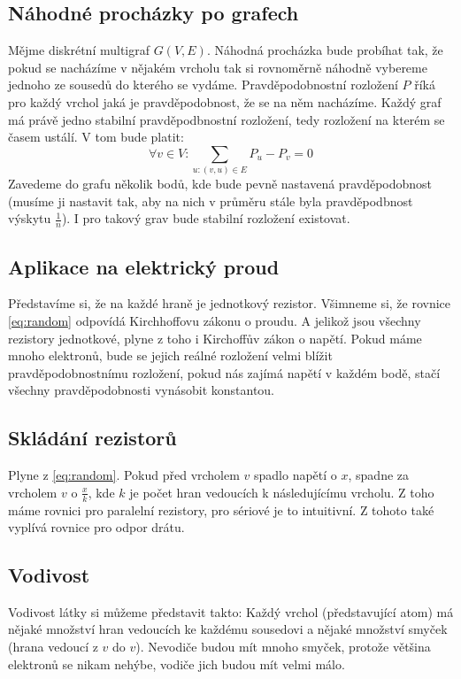 \documentclass[titlepage]{report}
\begin{document}
\subsection{Náhodné procházky po grafech}
Mějme diskrétní multigraf $G(V,E)$. Náhodná procházka bude probíhat tak, že pokud se nacházíme v nějakém vrcholu tak si rovnoměrně náhodně vybereme jednoho ze sousedů do kterého se vydáme. Pravděpodobnostní rozložení $P$ říká pro každý vrchol jaká je pravděpodobnost, že se na něm nacházíme. Každý graf má právě jedno stabilní pravděpodbnostní rozložení, tedy rozložení na kterém se časem ustálí. V tom bude platit:\\
\begin{equation}\label{eq:random}
\forall v \in V: \sum_{u: (v,u) \in E} P_u - P_v = 0
\end{equation}
Zavedeme do grafu několik bodů, kde bude pevně nastavená pravděpodobnost (musíme ji nastavit tak, aby na nich v průměru stále byla pravděpodbnost výskytu $\frac{1}{n}$). I pro takový grav bude stabilní rozložení existovat.
\subsection{Aplikace na elektrický proud}
Představíme si, že na každé hraně je jednotkový rezistor. Všimneme si, že rovnice \ref{eq:random} odpovídá Kirchhoffovu zákonu o proudu. A jelikož jsou všechny rezistory jednotkové, plyne z toho i Kirchoffův zákon o napětí. Pokud máme mnoho elektronů, bude se jejich reálné rozložení velmi blížit pravděpodobnostnímu rozložení, pokud nás zajímá napětí v každém bodě, stačí všechny pravděpodobnosti vynásobit konstantou.
\subsection{Skládání rezistorů}
Plyne z \ref{eq:random}. Pokud před vrcholem $v$ spadlo napětí o $x$, spadne za vrcholem $v$ o $\frac{x}{k}$, kde $k$ je počet hran vedoucích k následujícímu vrcholu. Z toho máme rovnici pro paralelní rezistory, pro sériové je to intuitivní. Z tohoto také vyplívá rovnice pro odpor drátu.
\subsection{Vodivost}
Vodivost látky si můžeme představit takto: Každý vrchol (představující atom) má nějaké množství hran vedoucích ke každému sousedovi a nějaké množství smyček (hrana vedoucí z $v$ do $v$). Nevodiče budou mít mnoho smyček, protože většina elektronů se nikam nehýbe, vodiče jich budou mít velmi málo.
\end{document}
